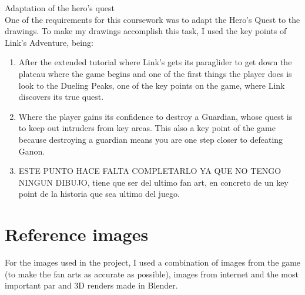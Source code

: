 \documentclass{cup-pan}
\begin{document}
    \textcolor{PANDarkBlue}{\large Adaptation of the hero's quest}\\
    One of the requirements for this coursework was to adapt the Hero's Quest to the drawings.
    To make my drawings accomplish this task, I used the key points of Link's Adventure, being:\\
        \begin{enumerate}
            \item After the extended tutorial where Link's gets its paraglider to get down the plateau where the game begins and one of the first things the player does is look to the Dueling Peaks, one of the key points on the game, where Link discovers its true quest.\\
            \item Where the player gains its confidence to destroy a Guardian, whose quest is to keep out intruders from key areas. This also a key point of the game because destroying a guardian means you are one step closer to defeating Ganon. \\
            \item ESTE PUNTO HACE FALTA COMPLETARLO YA QUE NO TENGO NINGUN DIBUJO, tiene que ser del ultimo fan art, en concreto de un key point de la historia que sea ultimo del juego. \\
        \end{enumerate}


\section{Reference images}

    For the images used in the project, I used a combination of images from the game (to make the fan arts as accurate as possible), images from internet and the most important par and 3D renders made in Blender.\\
\end{document}
